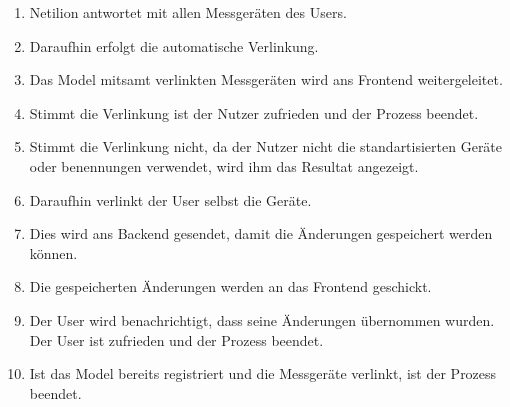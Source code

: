 \begin{enumerate}
  \item Netilion antwortet mit allen Messgeräten des Users.
  \item Daraufhin erfolgt die automatische Verlinkung.
  \item Das Model mitsamt verlinkten Messgeräten wird ans Frontend weitergeleitet.
  \item Stimmt die Verlinkung ist der Nutzer zufrieden und der Prozess beendet.
  \item Stimmt die Verlinkung nicht, da der Nutzer nicht die standartisierten Geräte oder benennungen verwendet, wird ihm das Resultat angezeigt.
  \item Daraufhin verlinkt der User selbst die Geräte.
  \item Dies wird ans Backend gesendet, damit die Änderungen gespeichert werden können.
  \item Die gespeicherten Änderungen werden an das Frontend geschickt.
  \item Der User wird benachrichtigt, dass seine Änderungen übernommen wurden. Der User ist zufrieden und der Prozess beendet.
  \item Ist das Model bereits registriert und die Messgeräte verlinkt, ist der Prozess beendet.
\end{enumerate}
